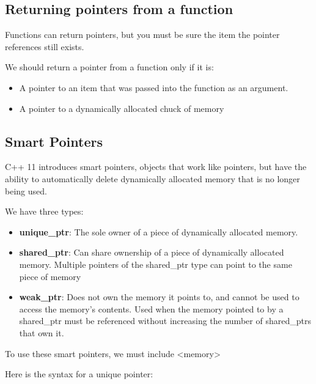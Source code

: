 \documentclass{report}
\begin{document}
    \bigbreak \noindent 
    \subsection{Returning pointers from a function}
    \bigbreak \noindent 
    \begin{concept}
 Functions can return pointers, but you must be sure the item the pointer references still exists.
	\end{concept}
    \bigbreak \noindent 
    We should return  a pointer from a function only if it is:
    \begin{itemize}
        \item A pointer to an item that was passed into the function as an argument.
        \item A pointer to a dynamically allocated chuck of memory
    \end{itemize}

    \bigbreak \noindent 
    \subsection{Smart Pointers}
    \bigbreak \noindent 
    \begin{concept}
 C++ 11 introduces smart pointers, objects that work like pointers, but have the ability to automatically delete dynamically allocated memory that is no longer being used.
	\end{concept}
    \bigbreak \noindent 
    We have three types:
    \begin{itemize}
        \item \textbf{unique\_ptr}: The sole owner of a piece of dynamically allocated memory. 
        \item \textbf{shared\_ptr}: Can share ownership of a piece of dynamically allocated memory. Multiple pointers of the shared\_ptr type can point to the same piece of memory
        \item \textbf{weak\_ptr}: Does not own the memory it points to, and cannot be used to access the memory's contents. Used when the memory pointed to by a shared\_ptr must be referenced without increasing the number of shared\_ptrs that own it.
    \end{itemize}
    \bigbreak \noindent 
    \begin{notebox}
			To use these smart pointers, we must include <memory>
		\end{notebox}

    \pagebreak
    Here is the syntax for a unique pointer:
    \bigbreak \noindent 
    
\end{document}
